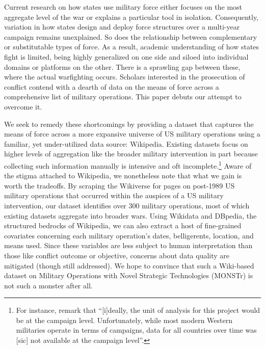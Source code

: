 \documentclass[fleqn,12pt]{article}
\begin{document}
Current research on how states use military force either focuses on the most aggregate level of the war or explains a particular tool in isolation. Consequently, variation in how states design and deploy force structures over a multi-year campaign remains unexplained. So does the relationship between complementary or substitutable types of force. As a result, academic understanding of how states fight is limited, being highly generalized on one side and siloed into individual domains or platforms on the other. There is a sprawling gap between these, where the actual warfighting occurs. Scholars interested in the prosecution of conflict contend with a dearth of data on the means of force across a comprehensive list of military operations. This paper debuts our attempt to overcome it.

We seek to remedy these shortcomings by providing a dataset that captures the means of force across a more expansive universe of US military operations using a familiar, yet under-utilized data source: Wikipedia. Existing datasets focus on higher levels of aggregation like the broader military intervention in part because collecting such information manually is intensive and oft incomplete.\footnote{For instance, \citet[549]{allen_understandingimpactair_2017} remark that ``[i]deally, the unit of analysis for this project would be at the campaign level. Unfortunately, while most modern Western militaries operate in terms of campaigns, data for all countries over time was [sic] not available at the campaign level”.} Aware of the stigma attached to Wikipedia, we nonetheless note that what we gain is worth the tradeoffs. By scraping the Wikiverse for pages on post-1989 US military operations that occurred within the auspices of a US military intervention, our dataset identifies over 300 military operations, most of which existing datasets aggregate into broader wars. Using Wikidata and DBpedia, the structured bedrocks of Wikipedia, we can also extract a host of fine-grained covariates concerning each military operation's dates, belligerents, location, and means used. Since these variables are less subject to human interpretation than those like conflict outcome or objective, concerns about data quality are mitigated (though still addressed). We hope to convince that such a Wiki-based dataset on Military Operations with Novel Strategic Technologies (MONSTr) is not such a monster after all.
	
\end{document}
